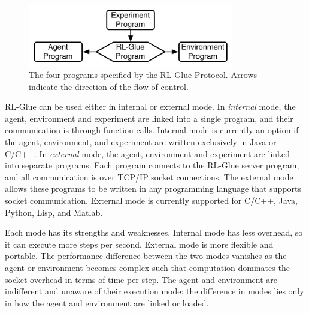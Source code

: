 \documentclass[twoside,11pt]{article}
\begin{document}
\begin{figure}[ht]
\begin{center}
\includegraphics[width=9cm]{glue.pdf}
\vspace{-0.2cm}
\caption{\small The four programs specified by the RL-Glue Protocol.  Arrows indicate the direction of the flow of control.}
\label{fig:RLDIA}
\end{center}
\vspace{-0.4cm}
\end{figure}

 RL-Glue can be used either in  internal or external mode.  In \textit{internal} mode, the agent, environment and experiment are linked into a single program, and their communication is through function calls.  Internal mode is currently an option if the agent, environment, and experiment are written exclusively in Java or C/C++.  In  \textit{external} mode, the agent, environment and experiment are linked into separate programs.  Each program connects to the RL-Glue server program, and all communication is over TCP/IP socket connections. The external mode allows these programs to be written in any programming language that supports socket communication.  External mode is currently supported for C/C++, Java, Python, Lisp, and Matlab.

Each mode has its strengths and weaknesses. Internal mode has less overhead, so it can execute more steps per second. External mode is more flexible and portable.  The performance difference between the two modes vanishes as the agent or environment becomes complex such that computation dominates the socket overhead in terms of time per step.  The agent and environment are indifferent and unaware of their execution mode: the difference in modes lies only in how the agent and environment are linked or loaded.
\end{document}

